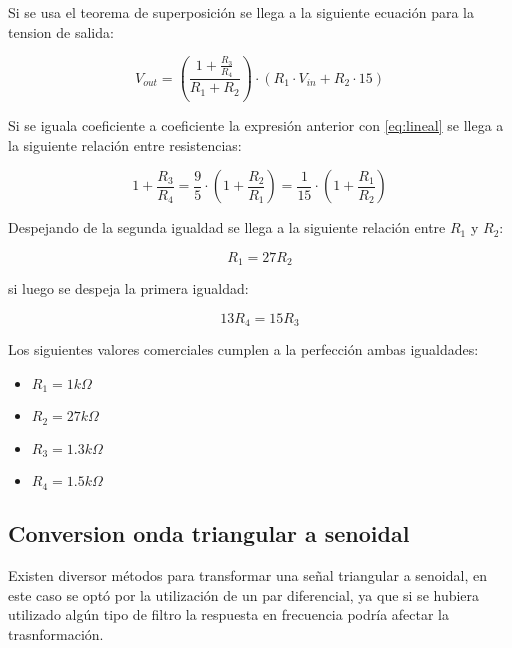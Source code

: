 Si se usa el teorema de superposición se llega a la siguiente ecuación para la tension de salida:

\begin{equation}
V_{out} = (\frac{1 + \frac{R_3}{R_4}}{R_1 + R_2})\cdot (R_1\cdot V_{in} + R_2\cdot 15)
\end{equation}

Si se iguala coeficiente a coeficiente la expresión anterior con \ref{eq:lineal} se llega a la siguiente relación entre resistencias:

\begin{equation}
1 + \frac{R_3}{R_4} = \frac{9}{5} \cdot (1 + \frac{R_2}{R_1}) =\frac{1}{15} \cdot (1 + \frac{R_1}{R_2})
\end{equation}

Despejando de la segunda igualdad se llega a la siguiente relación entre $R_1$ y $R_2$:

\begin{equation}
R_1 = 27R_2
\end{equation}

si luego se despeja la primera igualdad:

\begin{equation}
13R_4 = 15R_3
\end{equation}

Los siguientes valores comerciales cumplen a la perfección ambas igualdades:

\begin{itemize}
\item $R_1 = 1k\Omega$
\item $R_2 = 27k\Omega$
\item $R_3 = 1.3k\Omega$
\item $R_4 = 1.5k\Omega$
\end{itemize}

\newpage

\subsection{Conversion onda triangular a senoidal}
Existen diversor métodos para transformar una señal triangular a senoidal, en este caso se optó por la utilización de un par diferencial, ya que si se hubiera utilizado algún tipo de filtro la respuesta en frecuencia podría afectar la trasnformación.


